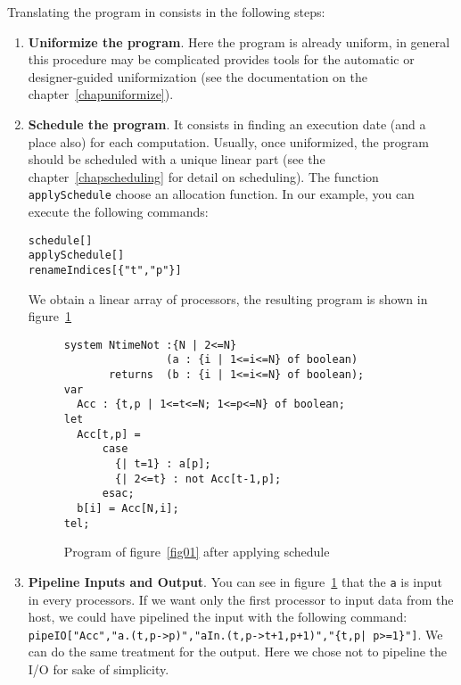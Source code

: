 Translating the program in {\AlphaZ} consists in the following steps: 
\begin{enumerate}
 \item {\bf Uniformize the program}. Here the program is already
uniform, in general this procedure may be complicated {\mmalpha}
provides tools for the automatic or designer-guided uniformization
(see the documentation on the chapter~\ref{chapuniformize}).
\item {\bf Schedule the program}. It consists in finding an execution
date (and a place also) for each computation. Usually, once
uniformized, the program should be scheduled with a unique linear part
(see the chapter~\ref{chapscheduling} for detail on scheduling). The
function {\tt applySchedule} choose an allocation function. In our example, 
you can execute  the following commands:
\begin{verbatim}
schedule[]
applySchedule[]
renameIndices[{"t","p"}]
\end{verbatim}
We obtain a linear array of processors,
the resulting program is shown in figure~\ref{fig02}
{\small
\begin{figure}[h]
\begin{center}
\begin{verbatim}
system NtimeNot :{N | 2<=N}
                (a : {i | 1<=i<=N} of boolean)
       returns  (b : {i | 1<=i<=N} of boolean);
var
  Acc : {t,p | 1<=t<=N; 1<=p<=N} of boolean;
let
  Acc[t,p] = 
      case
        {| t=1} : a[p];
        {| 2<=t} : not Acc[t-1,p];
      esac;
  b[i] = Acc[N,i];
tel;
\end{verbatim}
\caption{Program of figure~\ref{fig01} after applying schedule}
\label{fig02}
\end{center}
\end{figure}
}

\item {\bf Pipeline Inputs and Output}. You can see in figure~\ref{fig02}
that the  {\tt a} is input in every processors. If we want only the first processor to input data from the host, we could have pipelined the input with the following command:\\
\verb/pipeIO["Acc","a.(t,p->p)","aIn.(t,p->t+1,p+1)","{t,p| p>=1}"]/. We can do the same treatment for the output. Here we chose not to pipeline the I/O for sake of simplicity.


\end{enumerate}
